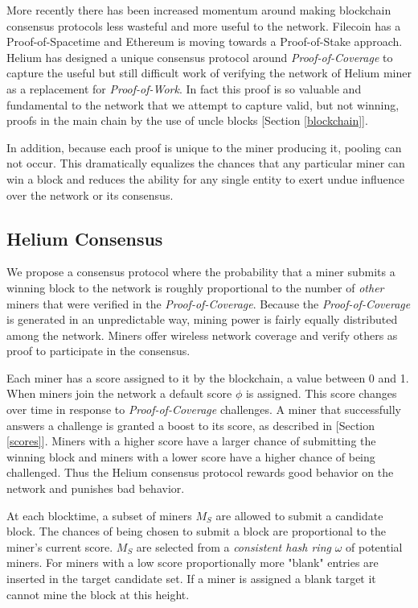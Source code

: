 \documentclass[10pt, nonatbib, nocopyrightspace, reprint]{sigplanconf}
\begin{document}
More recently there has been increased momentum around making blockchain consensus protocols less wasteful and more useful to the network. Filecoin \cite{filecoin} has a Proof-of-Spacetime and Ethereum \cite{ethereum} is moving towards a Proof-of-Stake approach. Helium has designed a unique consensus protocol around \emph{Proof-of-Coverage} to capture the useful but still difficult work of verifying the network of Helium miner as a replacement for \emph{Proof-of-Work}. In fact this proof is so valuable and fundamental to the network that we attempt to capture valid, but not winning, proofs in the main chain by the use of uncle blocks [Section \ref{blockchain}].

In addition, because each proof is unique to the miner producing it, pooling can not occur. This dramatically equalizes the chances that any particular miner can win a block and reduces the ability for any single entity to exert undue influence over the network or its consensus.

\subsection{Helium Consensus}

We propose a consensus protocol where the probability that a miner submits a winning block to the network is roughly proportional to the number of \emph{other} miners that were verified in the \emph{Proof-of-Coverage}. Because the \emph{Proof-of-Coverage} is generated in an unpredictable way, mining power is fairly equally distributed among the network. Miners offer wireless network coverage and verify others as proof to participate in the consensus.

Each miner has a score assigned to it by the blockchain, a value between 0 and 1. When miners join the network a default score $\phi$ is assigned. This score changes over time in response to \emph{Proof-of-Coverage} challenges. A miner that successfully answers a challenge is granted a boost to its score, as described in [Section \ref{scores}]. Miners with a higher score have a larger chance of submitting the winning block and miners with a lower score have a higher chance of being challenged. Thus the Helium consensus protocol rewards good behavior on the network and punishes bad behavior.

At each blocktime, a subset of miners $M_S$ are allowed to submit a candidate block. The chances of being chosen to submit a block are proportional to the miner's current score. $M_S$ are selected from a \emph{consistent hash ring} $\omega$ of potential miners. For miners with a low score proportionally more "blank" entries are inserted in the target candidate set. If a miner is assigned a blank target it cannot mine the block at this height. 
\end{document}

